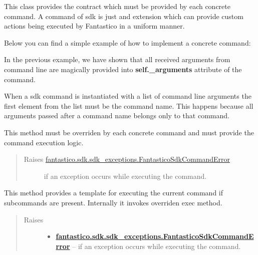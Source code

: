 \documentclass[letterpaper,10pt,english]{sphinxmanual}
\begin{document}

\begin{fulllineitems}
\label{features/sdk:fantastico.sdk.sdk_core.SdkCommand}
This class provides the contract which must be provided by each concrete command. A command of sdk is just and extension
which can provide custom actions being executed by Fantastico in a uniform manner.

Below you can find a simple example of how to implement a concrete command:

In the previous example, we have shown that all received arguments from command line are magically provided into
\textbf{self.\_arguments} attribute of the command.

When a sdk command is instantiated with a list of command line arguments the first element from the list must be the command
name. This happens because all arguments passed after a command name belongs only to that command.

\begin{fulllineitems}
\label{features/sdk:fantastico.sdk.sdk_core.SdkCommand.exec}
This method must be overriden by each concrete command and must provide the command execution logic.
\begin{quote}\begin{description}
\item[{Raises {\hyperref[features/sdk:fantastico.sdk.sdk_exceptions.FantasticoSdkCommandError]{fantastico.sdk.sdk\_exceptions.FantasticoSdkCommandError}}}] \leavevmode
if an exception occurs while executing the command.

\end{description}\end{quote}

\end{fulllineitems}


\begin{fulllineitems}
\label{features/sdk:fantastico.sdk.sdk_core.SdkCommand.exec_command}
This method provides a template for executing the current command if subcommands are present. Internally it invokes
overriden exec method.
\begin{quote}\begin{description}
\item[{Raises}] \leavevmode\begin{itemize}
\item {} 
{\hyperref[features/sdk:fantastico.sdk.sdk_exceptions.FantasticoSdkCommandError]{\textbf{fantastico.sdk.sdk\_exceptions.FantasticoSdkCommandError}}} -- if an exception occurs while executing the command.


\end{itemize}
\end{description}
\end{quote}
\end{fulllineitems}
\end{fulllineitems}
\end{document}
